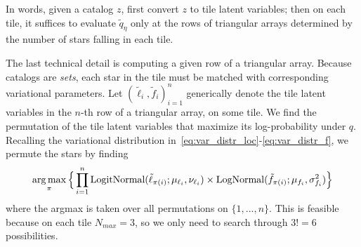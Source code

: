 In words, given a catalog $z$,
first convert $z$ to tile latent variables;
then on each tile, it suffices to evaluate $\tilde q_\eta$ only at the rows of triangular 
arrays determined by the number 
of stars falling in each tile. 

The last technical detail is computing 
a given row of a triangular array. 
Because catalogs are {\itshape sets},
each star in the tile must 
be matched with corresponding variational parameters. 
Let $(\tilde \ell_i, \tilde f_i)_{i = 1}^n$ generically denote the tile latent variables in the $n$-th row of a triangular array, on some tile. 
We find the permutation of the tile latent variables that maximize its log-probability under $q$. 
Recalling the variational distribution in~\eqref{eq:var_distr_loc}-\eqref{eq:var_distr_f}, we permute the stars by finding 
\begin{align}
    \operatorname*{arg\,max}_\pi \Big\{ \prod_{i=1}^n \text{LogitNormal}(\tilde \ell_{\pi(i)}; \mu_{\ell_{i}}, \nu_{\ell_{i}})\times 
	\text{LogNormal}(\tilde f_{\pi(i)}; \mu_{f_{i}}, \sigma^2_{f_{i}})\Big\}
\end{align}
where the argmax is taken over all permutations on $\{1, ..., n\}$. This is feasible because on each tile $N_{max} = 3$, so we only need to search through $3!=6$ possibilities. 